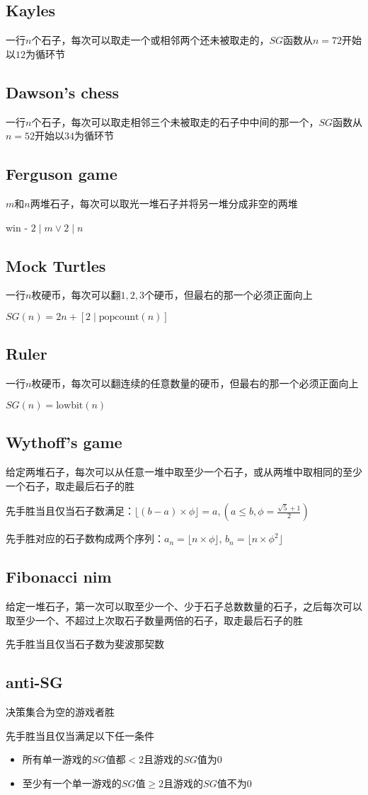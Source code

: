 \subsection*{Kayles}
    一行$ n $个石子，每次可以取走一个或相邻两个还未被取走的，$ SG $函数从$ n = 72 $开始以$ 12 $为循环节
\subsection*{Dawson's chess}
    一行$ n $个石子，每次可以取走相邻三个未被取走的石子中中间的那一个，$ SG $函数从$ n = 52 $开始以$ 34 $为循环节
\subsection*{Ferguson game}
    $ m $和$ n $两堆石子，每次可以取光一堆石子并将另一堆分成非空的两堆
    
    win - $ 2 \mid m \lor 2 \mid n $
\subsection*{Mock Turtles}
    一行$ n $枚硬币，每次可以翻$ 1, 2, 3 $个硬币，但最右的那一个必须正面向上
    
    $ SG(n) = 2n + [2 \mid \text{popcount}(n)] $
\subsection*{Ruler}
    一行$ n $枚硬币，每次可以翻连续的任意数量的硬币，但最右的那一个必须正面向上
    
    $ SG(n) = \text{lowbit}(n) $
\subsection*{Wythoff's game}
    给定两堆石子，每次可以从任意一堆中取至少一个石子，或从两堆中取相同的至少一个石子，取走最后石子的胜
    
    先手胜当且仅当石子数满足：$\lfloor (b - a) \times \phi \rfloor=a, (a \leq b, \phi = \frac{\sqrt{5} + 1}{2})$
    
    先手胜对应的石子数构成两个序列：$a_n = \lfloor n \times \phi \rfloor$, $b_n = \lfloor n \times \phi ^ 2 \rfloor$
\subsection*{Fibonacci nim}
    给定一堆石子，第一次可以取至少一个、少于石子总数数量的石子，之后每次可以取至少一个、不超过上次取石子数量两倍的石子，取走最后石子的胜
    
    先手胜当且仅当石子数为斐波那契数
\subsection*{anti-SG}
    决策集合为空的游戏者胜
    
    先手胜当且仅当满足以下任一条件
    \begin{itemize}[nosep,wide=0pt]
        \item 所有单一游戏的$ SG $值都$ < 2 $且游戏的$ SG $值为$ 0 $
        \item 至少有一个单一游戏的$ SG $值$ \geq 2 $且游戏的$ SG $值不为$ 0 $
    \end{itemize}

